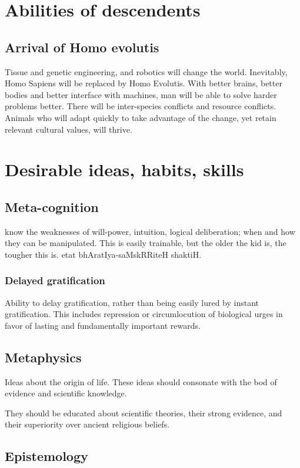 \documentclass[oneside, article]{memoir}
\begin{document}
\section{Abilities of descendents}
\subsection{Arrival of Homo evolutis}
Tissue and genetic engineering, and robotics will change the world. Inevitably, Homo Sapiens will be replaced by Homo Evolutis. With better brains, better bodies and better interface with machines, man will be able to solve harder problems better. There will be inter-species conflicts and resource conflicts. Animals who will adapt quickly to take advantage of the change, yet retain relevant cultural values, will thrive.

\section{Desirable ideas, habits, skills}
\subsection{Meta-cognition}
know the weaknesses of will-power, intuition, logical deliberation; when and how they can be manipulated. This is easily trainable, but the older the kid is, the tougher this is. etat bhAratIya-saMskRRiteH shaktiH.

\subsubsection{Delayed gratification}
Ability to delay gratification, rather than being easily lured by instant gratification. This includes repression or circumlocution of biological urges in favor of lasting and fundamentally important rewards.

\subsection{Metaphysics}
Ideas about the origin of life. These ideas should consonate with the bod of evidence and scientific knowledge.

\subitem They should be educated about scientific theories, their strong evidence, and their superiority over ancient religious beliefs.

\subsection{Epistemology}
\end{document}
